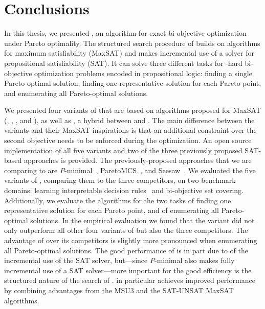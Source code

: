 \chapter{Conclusions\label{chap:conclusion}}

In this thesis, we presented \algname{}, an algorithm for exact bi-objective optimization under Pareto optimality.
The structured search procedure of \algname{} builds on algorithms for maximum satisfiability (MaxSAT) and makes incremental use of a solver for propositional satisfiability (SAT).
It can solve three different tasks for \NP-hard bi-objective optimization problems encoded in propositional logic:
finding a single Pareto-optimal solution, finding one representative solution for each Pareto point, and enumerating all Pareto-optimal solutions.

We presented four variants of \algname{} that are based on algorithms proposed for MaxSAT (\satunsat{}, \unsatsat{}, \msu{}, and \oll{}), as well as \msh{}, a hybrid between \msu{} and \satunsat{}.
The main difference between the \algname{} variants and their MaxSAT inspirations is that an additional constraint over the second objective needs to be enforced during the optimization.
An open source implementation of all five variants and two of the three previously proposed SAT-based approaches is provided.
The previously-proposed approaches that we are comparing to are $P$-minimal~\autocite{DBLP:conf/cp/SohBTB17}, ParetoMCS~\autocite{DBLP:conf/ijcai/Terra-NevesLM18a}, and Seesaw~\autocite{DBLP:conf/cp/JanotaMSM21}.
We evaluated the five variants of \algname{}, comparing them to the three competitors, on two benchmark domains: learning interpretable decision rules~\autocite{DBLP:conf/cp/MaliotovM18} and bi-objective set covering.
Additionally, we evaluate the algorithms for the two tasks of finding one representative solution for each Pareto point, and of enumerating all Pareto-optimal solutions.
In the empirical evaluation we found that the \msh{} variant did not only outperform all other four variants of \algname{} but also the three competitors.
The advantage of \algname{} over its competitors is slightly more pronounced when enumerating all Pareto-optimal solutions.
The good performance of \algname{} is in part due to of the incremental use of the SAT solver, but---since $P$-minimal also makes fully incremental use of a SAT solver---more important for the good efficiency is the structured nature of the search of \algname{}.
\msh{} in particular achieves improved performance by combining advantages from the MSU3 and the SAT-UNSAT MaxSAT algorithms.

